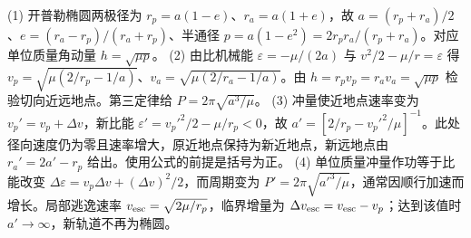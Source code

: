 (1) 开普勒椭圆两极径为 \(r_p=a(1-e)\)、\(r_a=a(1+e)\)，故 \(a=(r_p+r_a)/2\)、\(e=(r_a-r_p)/(r_a+r_p)\)、半通径 \(p=a(1-e^2)=2r_pr_a/(r_p+r_a)\)。对应单位质量角动量 \(h=\sqrt{\mu p}\)。
(2) 由比机械能 \(\varepsilon=-\mu/(2a)\) 与 \(v^2/2-\mu/r=\varepsilon\) 得 \(v_p=\sqrt{\mu(2/r_p-1/a)}\)、\(v_a=\sqrt{\mu(2/r_a-1/a)}\)。由 \(h=r_pv_p=r_av_a=\sqrt{\mu p}\) 检验切向近远地点。第三定律给 \(P=2\pi\sqrt{a^3/\mu}\)。
(3) 冲量使近地点速率变为 \(v_p'=v_p+\Delta v\)，新比能 \(\varepsilon'=v_p'^2/2-\mu/r_p<0\)，故 \(a'=[2/r_p-v_p'^2/\mu]^{-1}\)。此处径向速度仍为零且速率增大，原近地点保持为新近地点，新远地点由 \(r_a'=2a'-r_p\) 给出。使用公式的前提是括号为正。
(4) 单位质量冲量作功等于比能改变 \(\Delta\varepsilon=v_p\Delta v+(\Delta v)^2/2\)，而周期变为 \(P'=2\pi\sqrt{a'^3/\mu}\)，通常因顺行加速而增长。局部逃逸速率 \(v_{\rm esc}=\sqrt{2\mu/r_p}\)，临界增量为 \(\Delta v_{\rm esc}=v_{\rm esc}-v_p\)；达到该值时 \(a'\to\infty\)，新轨道不再为椭圆。
